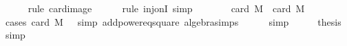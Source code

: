 \begin{isabellebody}
\ \ \ \ \isamarkupfalse%
\ {\isacharparenleft}{\kern0pt}rule\ card{\isacharunderscore}{\kern0pt}image{\isacharparenright}{\kern0pt}\isanewline
\ \ \ \ \isamarkupfalse%
\ {\isacharparenleft}{\kern0pt}rule\ inj{\isacharunderscore}{\kern0pt}onI{\isacharcomma}{\kern0pt}\ simp{\isacharparenright}{\kern0pt}\isanewline
\ \ \isamarkupfalse%
\ \isamarkupfalse%
\ {\isachardoublequoteopen}{\isachardot}{\kern0pt}{\isachardot}{\kern0pt}{\isachardot}{\kern0pt}\ {\isacharequal}{\kern0pt}\ card\ M\ {\isacharasterisk}{\kern0pt}\ {\isacharparenleft}{\kern0pt}card\ M\ {\isacharminus}{\kern0pt}\ {}{\isacharparenright}{\kern0pt}{\isachardoublequoteclose}\isanewline
\ \ \ \ \isamarkupfalse%
\ {\isacharparenleft}{\kern0pt}cases\ {\isachardoublequoteopen}card\ M\ {\isasymge}\ {}{\isachardoublequoteclose}{\isacharcomma}{\kern0pt}\ simp\ add{\isacharcolon}{\kern0pt}power{}{\isacharunderscore}{\kern0pt}eq{\isacharunderscore}{\kern0pt}square\ algebra{\isacharunderscore}{\kern0pt}simps{\isacharparenright}{\kern0pt}\isanewline
\ \ \ \ \isamarkupfalse%
\ simp\isanewline
\ \ \isamarkupfalse%
\ \isamarkupfalse%
\ {\isacharquery}{\kern0pt}thesis\ \isamarkupfalse%
\ simp\isanewline
{}\isamarkupfalse%
%
\endisatagproof
{\isafoldproof}%
%
\isadelimproof
\isanewline
%
\endisadelimproof
%
\isadelimtheory
\isanewline
%
\endisadelimtheory
%
\isatagtheory
{}\isamarkupfalse%
%
\endisatagtheory
{\isafoldtheory}%
%
\isadelimtheory
%
\endisadelimtheory
%
\end{isabellebody}%
\endinput
